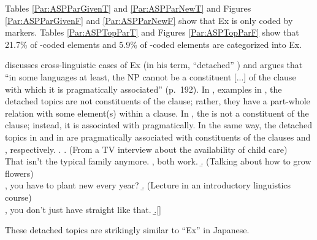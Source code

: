 Tables \ref{Par:ASPParGivenT} and \ref{Par:ASPParNewT} and
Figures \ref{Par:ASPParGivenF} and \ref{Par:ASPParNewF}
show that Ex is only coded by  markers.
Tables \ref{Par:ASPTopParT} and Figures \ref{Par:ASPTopParF}
show that 21.7\% of -coded elements and
5.9\% of -coded elements are categorized into Ex.

discusses cross-linguistic cases of Ex (in his term, ``detached'' )
and argues that
``in some languages at least, the  NP cannot be a constituent [...] of the clause with which it is pragmatically associated'' (p.~192).
In \Next, examples in ,
the detached topics are not constituents of the clause;
rather, they have a part-whole relation with some element(s) within a clause.
In \Next[a], the   is not a constituent of the clause;
instead, it is associated with  pragmatically.
In the same way, the detached topics  in \Next[b] and
 in \Next[c]
are pragmatically associated with constituents of the clauses  and , respectively.
%
\ex.
 \a. (From a TV interview about the availability of child care) \\
   That isn't the typical family anymore.
   ,
    both work.
 \b. (Talking about how to grow flowers) \\
   , you have to plant new  every year?
 \b. (Lecture in an introductory linguistics course) \\
   , you don't just have straight  like that.
  \b.[] \hfill{\cite[193]{lambrecht94}}

These detached topics are strikingly similar to
``Ex'' in Japanese.

